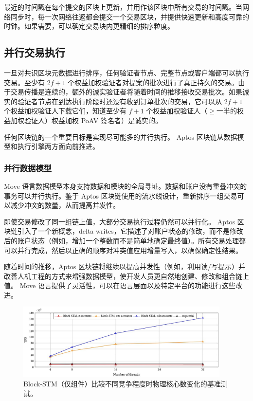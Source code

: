\documentclass{article}
\begin{document}
最近的时间戳在每个提交的区块上更新，并用作该区块中所有交易的时间戳。当网络同步时，每一次网络往返都会提交一个交易区块，并提供快速更新和高度可靠的时钟。如果需要，可以确定交易块内更精细的排序粒度。

\subsection{并行交易执行}
\label{subsec:parallel_transaction_execution}

一旦对共识区块元数据进行排序，任何验证者节点、完整节点或客户端都可以执行交易。至少有 $2f+1$ 个权益加权验证者对提案的批次进行了真正持久的交易。由于交易传播是连续的，额外的诚实验证者将随着时间的推移接收交易批次。如果诚实的验证者节点在到达执行阶段时还没有收到订单批次的交易，它可以从 $2f+1$ 个权益加权验证人下载它们，知道至少有 $f+1$ 个权益加权验证人（$\ge$一半的权益加权验证人）权益加权 PoAV 签名者）是诚实的。

任何区块链的一个重要目标是实现尽可能多的并行执行。 Aptos 区块链从数据模型和执行引擎两方面向前推进。

\subsubsection{并行数据模型}

Move 语言数据模型本身支持数据和模块的全局寻址。数据和账户没有重叠冲突的事务可以并行执行。鉴于 Aptos 区块链使用的流水线设计，重新排序一组交易可以减少冲突的数量，从而提高并发性。

即使交易修改了同一组链上值，大部分交易执行过程仍然可以并行化。 Aptos 区块链引入了一个新概念，delta writes，它描述了对账户状态的修改，而不是修改后的账户状态（例如，增加一个整数而不是简单地确定最终值）。所有交易处理都可以并行完成，然后以正确的顺序对冲突值应用增量写入，以确保确定性结果。

随着时间的推移，Aptos 区块链将继续以提高并发性（例如，利用读/写提示）并改善人机工程的方式来增强数据模型，使开发人员更自然地创建、修改和组合链上值。 Move 语言提供了灵活性，可以在语言层面以及特定平台的功能进行这些改进。

\begin{figure}
\centering
\includegraphics[width=0.95\textwidth]{perf.jpg}
\caption{\label{fig:perf}Block-STM（仅组件）比较不同竞争程度时物理核心数变化的基准测试。}
\end{figure}
\end{document}
